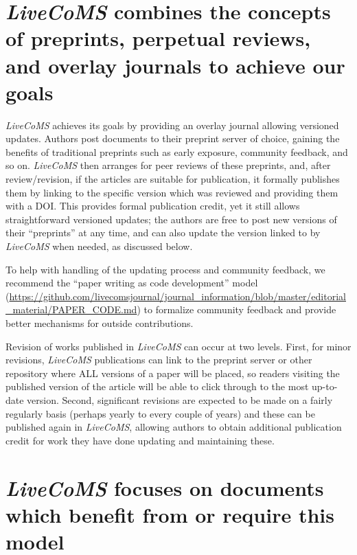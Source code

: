 \documentclass[9pt]{livecoms}
\begin{document}
\section{\emph{LiveCoMS} combines the concepts of preprints, perpetual reviews, and overlay journals to achieve our goals}

\emph{LiveCoMS} achieves its goals by providing an overlay journal allowing versioned updates.
Authors post documents to their preprint server of choice, gaining the benefits of traditional preprints such as early exposure, community feedback, and so on. 
\emph{LiveCoMS} then arranges for peer reviews of these preprints, and, after review/revision, if the articles are suitable for publication, it formally publishes them by linking to the specific version which was reviewed and providing them with a DOI.
This provides formal publication credit, yet it still allows straightforward versioned updates; the authors are free to post new versions of their ``preprints'' at any time, and can also update the version linked to by \emph{LiveCoMS} when needed, as discussed below.

To help with handling of the updating process and community feedback, we recommend the ``paper writing as code development'' model (\url{https://github.com/livecomsjournal/journal_information/blob/master/editorial_material/PAPER_CODE.md}) to formalize community feedback and provide better mechanisms for outside contributions. 

Revision of works published in \emph{LiveCoMS} can occur at two levels. 
First, for minor revisions, \emph{LiveCoMS} publications can link to the preprint server or other repository where ALL versions of a paper will be placed, so readers visiting the published version of the article will be able to click through to the most up-to-date version.
Second, significant revisions are expected to be made on a fairly regularly basis (perhaps yearly to every couple of years) and these can be published again in \emph{LiveCoMS}, allowing authors to obtain additional publication credit for work they have done updating and maintaining these. 

\section{\emph{LiveCoMS} focuses on documents which benefit from or require this model}
\end{document}
